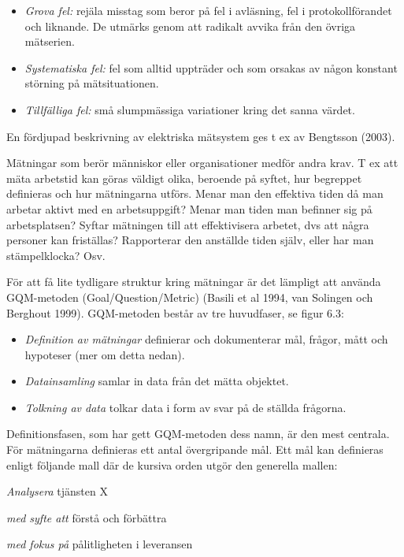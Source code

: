 \begin{itemize}
\item
  \emph{Grova fel:} rejäla misstag som beror på fel i avläsning, fel i
  protokollförandet och liknande. De utmärks genom att radikalt avvika
  från den övriga mätserien.
\item
  \emph{Systematiska fel:} fel som alltid uppträder och som orsakas av
  någon konstant störning på mätsituationen.
\item
  \emph{Tillfälliga fel:} små slumpmässiga variationer kring det sanna
  värdet.
\end{itemize}

En fördjupad beskrivning av elektriska mätsystem ges t ex av Bengtsson
(2003).

Mätningar som berör människor eller organisationer medför andra krav. T
ex att mäta arbetstid kan göras väldigt olika, beroende på syftet, hur
begreppet definieras och hur mätningarna utförs. Menar man den effektiva
tiden då man arbetar aktivt med en arbetsuppgift? Menar man tiden man
befinner sig på arbetsplatsen? Syftar mätningen till att effektivisera
arbetet, dvs att några personer kan friställas? Rapporterar den
anställde tiden själv, eller har man stämpelklocka? Osv.

För att få lite tydligare struktur kring mätningar är det lämpligt att
använda GQM-metoden (Goal/Question/Metric) (Basili et al 1994, van
Solingen och Berghout 1999). GQM-metoden består av tre huvudfaser, se
figur 6.3:

\begin{itemize}
\item
  \emph{Definition av mätningar} definierar och dokumenterar mål,
  frågor, mått och hypoteser (mer om detta nedan).
\item
  \emph{Datainsamling} samlar in data från det mätta objektet.
\item
  \emph{Tolkning av data} tolkar data i form av svar på de ställda
  frågorna.
\end{itemize}

Definitionsfasen, som har gett GQM-metoden dess namn, är den mest
centrala. För mätningarna definieras ett antal övergripande mål. Ett mål
kan definieras enligt följande mall där de kursiva orden utgör den
generella mallen:

\emph{Analysera} tjänsten X

\emph{med syfte att} förstå och förbättra

\emph{med fokus på} pålitligheten i leveransen

